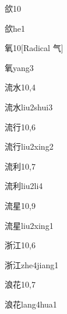 \begin{entry}{欱}{10}
  \begin{phonetics}{欱}{he1}
  \end{phonetics}
\end{entry}

\begin{entry}{氧}{10}[Radical 气]
  \begin{phonetics}{氧}{yang3}
  \end{phonetics}
\end{entry}

\begin{entry}{流水}{10,4}
  \begin{phonetics}{流水}{liu2shui3}
  \end{phonetics}
\end{entry}

\begin{entry}{流行}{10,6}
  \begin{phonetics}{流行}{liu2xing2}
  \end{phonetics}
\end{entry}

\begin{entry}{流利}{10,7}
  \begin{phonetics}{流利}{liu2li4}
  \end{phonetics}
\end{entry}

\begin{entry}{流星}{10,9}
  \begin{phonetics}{流星}{liu2xing1}
  \end{phonetics}
\end{entry}

\begin{entry}{浙江}{10,6}
  \begin{phonetics}{浙江}{zhe4jiang1}
  \end{phonetics}
\end{entry}

\begin{entry}{浪花}{10,7}
  \begin{phonetics}{浪花}{lang4hua1}
  \end{phonetics}
\end{entry}

